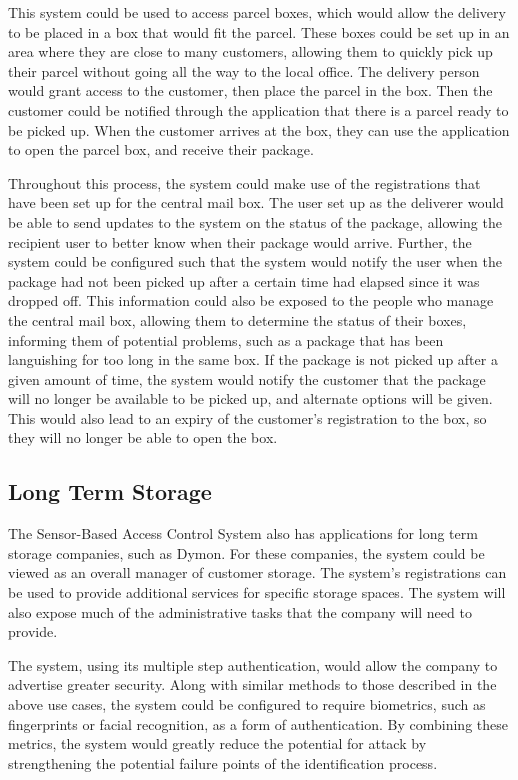 \documentclass{article}
\begin{document}
This system could be used to access parcel boxes, which would allow the delivery to be placed in a box that would fit 
the parcel. These boxes could be set up in an area where they are close to many customers, allowing them to quickly 
pick up their parcel without going all the way to the local office. The delivery person would grant access to the 
customer, then place the parcel in the box. Then the customer could be notified through the application that there is a 
parcel ready to be picked up. When the customer arrives at the box, they can use the application to open the parcel 
box, and receive their package.

Throughout this process, the system could make use of the registrations that have been set up for the central mail
box. The user set up as the deliverer would be able to send updates to the system on the status of the package, allowing
the recipient user to better know when their package would arrive. Further, the system could be configured such that the
system would notify the user when the package had not been picked up after a certain time had elapsed since it was
dropped off. This information could also be exposed to the people who manage the central mail box, allowing them to
determine the status of their boxes, informing them of potential problems, such as a package that has been languishing
for too long in the same box. If the package is not picked up after a given amount of time, the system would notify the
customer that the package will no longer be available to be picked up, and alternate options will be given. This would
also lead to an expiry of the customer's registration to the box, so they will no longer be able to open the box.

\subsection{Long Term Storage}

The Sensor-Based Access Control System also has applications for long term storage companies, such as Dymon. For these 
companies, the system could be viewed as an overall manager of customer storage. The system's registrations can be used 
to provide additional services for specific storage spaces. The system will also expose much of the administrative 
tasks that the company will need to provide.

The system, using its multiple step authentication, would allow the company to advertise greater security. Along with
similar methods to those described in the above use cases, the system could be configured to require biometrics, such
as fingerprints or facial recognition, as a form of authentication. By combining these metrics, the system would greatly
reduce the potential for attack by strengthening the potential failure points of the identification process.
\end{document}
